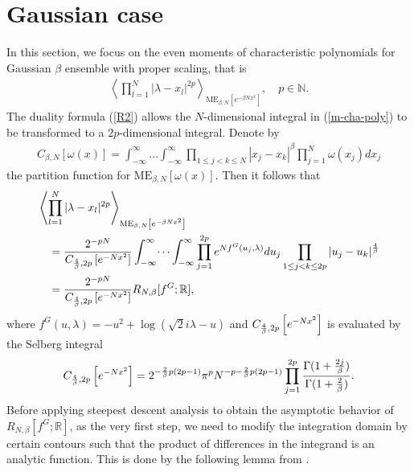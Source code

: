 \documentclass[11pt,a4paper]{article}
\numberwithin{equation}{section} %
\theoremstyle{plain}
\theoremstyle{definition}
\numberwithin{prop}{section}
\numberwithin{cor}{section}
\numberwithin{remark}{section}
\begin{document}
\section{Gaussian case}\label{S3}
In this section, we focus on the even moments of characteristic polynomials for Gaussian $\beta$ ensemble with proper scaling, that is 
\begin{align}\label{m-cha-poly}
	\left\langle\prod_{l=1}^N |\lambda-x_l|^{2 p}\right\rangle_{\mathrm{ME}_{\beta, N}\left[e^{-\beta N x^2}\right]},\quad p\in\mathbb{N}.
\end{align}
The  duality formula (\ref{R2}) allows 
the $N$-dimensional integral in (\ref{m-cha-poly}) to be transformed to a $2p$-dimensional integral. Denote by
\begin{align}\label{Cb}
    C_{\beta,N}\left[\omega(x)\right]=\int_{-\infty}^{\infty}\dots\int_{-\infty}^{\infty}\prod_{1\leq j<k\leq N}|x_j-x_k|^\beta \prod_{j=1}^{N}\omega(x_j)dx_j
\end{align}
the partition function for $\mathrm{ME}_{{\beta},N}[\omega(x)]$.
Then it follows that
\begin{align}\label{A=CR}
	&\left\langle\prod_{l=1}^N |\lambda-x_l|^{2 p}\right\rangle_{\mathrm{ME}_{\beta, N}\left[e^{-\beta N x^2}\right]}\nonumber\\
	&\quad ={2^{-pN}\over C_{{4\over\beta},2p}\left[e^{-Nx^2}\right]}\int_{-\infty}^{\infty}\dots\int_{-\infty}^{\infty}\prod_{j=1}^{2p}e^{Nf^G(u_j,\lambda)}du_j\prod_{1\leq j<k\leq 2p}|u_j-u_k|^{{4\over\beta}}\nonumber\\
    &\quad={2^{-pN}\over C_{{4\over\beta},2p}\left[e^{-Nx^2}\right]}R_{N,\beta}[f^G;\mathbb{R}],
\end{align}
where $f^G(u,\lambda)=-u^2+\log(\sqrt{2}i\lambda-u)$ and $C_{{4\over\beta},2p}\left[e^{-Nx^2}\right]$ is evaluated by the Selberg integral
\begin{align}\label{3.6}
	C_{{4\over\beta},2p}\left[e^{-Nx^2}\right]=2^{-{2\over\beta}p(2p-1)}\pi^{p}N^{-p-{2\over\beta}p(2p-1)}\prod_{j=1}^{2p}{\Gamma(1+{2j\over\beta})\over \Gamma(1+{2\over\beta})}.
\end{align}
Before applying steepest descent analysis to obtain the asymptotic behavior of $R_{N,\beta}[f^G;\mathbb{R}]$, as the very first step, we need to modify the integration domain by certain contours such that the product of differences in the integrand is an analytic function. This is done by the following lemma from \cite[Lemma 1]{DF06}.
\end{document}
